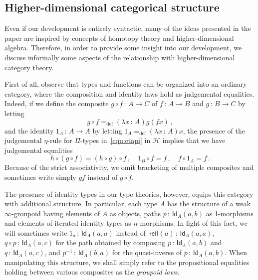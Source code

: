 \documentclass[10pt,a4paper,oneside,reqno]{amsart}
\numberwithin{equation}{section}
\theoremstyle{mythm}
\theoremstyle{mydef}
\theoremstyle{myrmk}
\newcommand{\defeq}{=_{\mathrm{def}}}
\newcommand{\co}{\,{:}\,}
\newcommand{\Hint}{\mathcal{H}}
\newcommand{\Id}{\mathsf{Id}}
\newcommand{\refl}{\mathsf{refl}}
\begin{document}
\subsection{Higher-dimensional categorical structure} Even if our development is entirely syntactic,
many of the ideas presented in the paper are inspired by concepts of homotopy theory and higher-dimensional
algebra. Therefore, in order to provide
some insight into our development, we discuss informally some aspects of the relationship with higher-dimensional category theory. 

 First of all, observe that types and functions can be organized into an ordinary 
 category, where the composition and identity laws hold as judgemental equalities. Indeed, if we define the composite $g \circ f \co A 
\to C$ of $f \co A \to B$ and $g \co B \to C$ by letting
\[
 g \circ f \defeq (\lambda x \co A) g ( f  x) \, ,
 \]
 and the identity $1_A \co A \to A$ by letting $1_A \defeq (\lambda x \co A) x$, 
 the presence of the judgemental $\eta$-rule for $\Pi$-types in~\eqref{equ:etapi} in $\Hint$ implies that
 we have judgemental equalities
 \[
  h \circ (g \circ f) = (h \circ g) \circ f \, , \quad 1_B \circ f =  f \, , \quad  f \circ 1_A = f \, .
  \] 
  Because of the strict associativity, we omit bracketing of multiple composites and sometimes write simply $gf$ instead of $g \circ f$. 

The presence of identity types in our type theories, however, equips this category with additional structure. In particular,
each  type $A$ has the structure of a weak $\infty$-groupoid having  elements of $A$ as objects, paths
$p \co \Id_A(a,b)$ as 1-morphisms and elements of iterated identity types as $n$-morphisms. 
In light of this fact, we will sometimes write $1_a \co \Id_A(a,a)$ instead of~$\refl(a) \co \Id_A(a,a)$,
$q \circ p \co \Id_A(a,c)$ for the path obtained by composing $p \co \Id_A(a,b)$ and~$q \co \Id_A(a,c)$,
and $p^{-1} \co \Id_A(b,a)$ for the quasi-inverse of $p \co \Id_A(a,b)$. 
When manipulating this structure, we shall simply refer to the  propositional equalities holding between 
various composites as the \emph{groupoid laws}.
\end{document}
